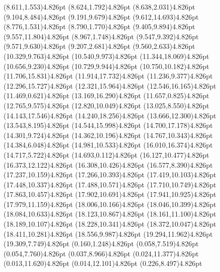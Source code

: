 \documentclass[10pt]{article}
\begin{document}
{{\qdisk(8.611,1.553){4.826pt}%
\qdisk(8.624,1.792){4.826pt}%
\qdisk(8.638,2.031){4.826pt}%
\qdisk(9.104,8.484){4.826pt}%
\qdisk(9.191,9.679){4.826pt}%
\qdisk(9.612,14.693){4.826pt}%
\qdisk(8.776,1.531){4.826pt}%
\qdisk(8.790,1.770){4.826pt}%
\qdisk(9.405,9.894){4.826pt}%
\qdisk(9.557,11.804){4.826pt}%
\qdisk(8.967,1.748){4.826pt}%
\qdisk(9.547,9.392){4.826pt}%
\qdisk(9.571,9.630){4.826pt}%
\qdisk(9.207,2.681){4.826pt}%
\qdisk(9.560,2.633){4.826pt}%
\qdisk(10.329,9.763){4.826pt}%
\qdisk(10.540,9.973){4.826pt}%
\qdisk(11.344,18.069){4.826pt}%
\qdisk(10.656,9.230){4.826pt}%
\qdisk(10.729,9.944){4.826pt}%
\qdisk(10.750,10.182){4.826pt}%
\qdisk(11.706,15.831){4.826pt}%
\qdisk(11.914,17.732){4.826pt}%
\qdisk(11.236,9.377){4.826pt}%
\qdisk(12.296,15.727){4.826pt}%
\qdisk(12.321,15.964){4.826pt}%
\qdisk(12.546,16.165){4.826pt}%
\qdisk(11.469,0.621){4.826pt}%
\qdisk(13.169,16.290){4.826pt}%
\qdisk(11.657,0.825){4.826pt}%
\qdisk(12.765,9.575){4.826pt}%
\qdisk(12.820,10.049){4.826pt}%
\qdisk(13.025,8.550){4.826pt}%
\qdisk(14.143,17.546){4.826pt}%
\qdisk(14.240,18.256){4.826pt}%
\qdisk(13.666,12.300){4.826pt}%
\qdisk(13.543,8.195){4.826pt}%
\qdisk(14.544,15.998){4.826pt}%
\qdisk(14.700,17.178){4.826pt}%
\qdisk(14.301,9.724){4.826pt}%
\qdisk(14.362,10.196){4.826pt}%
\qdisk(14.767,10.343){4.826pt}%
\qdisk(14.384,6.048){4.826pt}%
\qdisk(14.981,10.533){4.826pt}%
\qdisk(16.010,16.374){4.826pt}%
\qdisk(14.717,5.722){4.826pt}%
\qdisk(14.693,0.112){4.826pt}%
\qdisk(16.127,10.477){4.826pt}%
\qdisk(16.373,12.122){4.826pt}%
\qdisk(16.308,10.426){4.826pt}%
\qdisk(16.577,8.390){4.826pt}%
\qdisk(17.237,10.159){4.826pt}%
\qdisk(17.266,10.393){4.826pt}%
\qdisk(17.419,10.103){4.826pt}%
\qdisk(17.448,10.337){4.826pt}%
\qdisk(17.488,10.571){4.826pt}%
\qdisk(17.710,10.749){4.826pt}%
\qdisk(17.863,10.457){4.826pt}%
\qdisk(17.902,10.691){4.826pt}%
\qdisk(17.941,10.925){4.826pt}%
\qdisk(17.979,11.159){4.826pt}%
\qdisk(18.006,10.166){4.826pt}%
\qdisk(18.046,10.399){4.826pt}%
\qdisk(18.084,10.633){4.826pt}%
\qdisk(18.123,10.867){4.826pt}%
\qdisk(18.161,11.100){4.826pt}%
\qdisk(18.189,10.107){4.826pt}%
\qdisk(18.228,10.341){4.826pt}%
\qdisk(18.372,10.047){4.826pt}%
\qdisk(18.411,10.281){4.826pt}%
\qdisk(18.556,9.987){4.826pt}%
\qdisk(19.294,11.962){4.826pt}%
\qdisk(19.309,7.749){4.826pt}%
\dummycolor
\qdisk(0.160,1.248){4.826pt}%
\qdisk(0.058,7.519){4.826pt}%
\qdisk(0.054,7.760){4.826pt}%
\qdisk(0.037,8.966){4.826pt}%
\qdisk(0.024,11.377){4.826pt}%
\qdisk(0.013,11.620){4.826pt}%
\qdisk(0.014,12.101){4.826pt}%
\qdisk(0.226,8.497){4.826pt}%
}}
\end{document}
